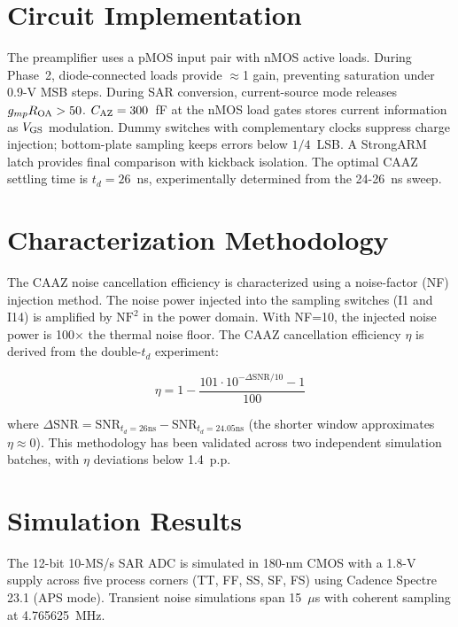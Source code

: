 \documentclass[journal]{IEEEtran}
\begin{document}
\section{Circuit Implementation}
\label{sec:imp}

The preamplifier uses a pMOS input pair with nMOS active loads. During Phase~2, diode-connected loads provide $\approx$1 gain, preventing saturation under 0.9-V MSB steps. During SAR conversion, current-source mode releases $g_{mp}R_{\rm OA}>50$. $C_{\rm AZ}=300$~fF at the nMOS load gates stores current information as $V_{\rm GS}$ modulation. Dummy switches with complementary clocks suppress charge injection; bottom-plate sampling keeps errors below $1/4$~LSB. A StrongARM latch provides final comparison with kickback isolation. The optimal CAAZ settling time is $t_d=26$~ns, experimentally determined from the 24-26~ns sweep.

\section{Characterization Methodology}
\label{sec:method}

The CAAZ noise cancellation efficiency is characterized using a noise-factor (NF) injection method. The noise power injected into the sampling switches (I1 and I14) is amplified by $\text{NF}^2$ in the power domain. With NF=10, the injected noise power is 100$\times$ the thermal noise floor. The CAAZ cancellation efficiency $\eta$ is derived from the double-$t_d$ experiment:

\begin{equation}
\eta = 1 - \frac{101\cdot 10^{-\Delta\text{SNR}/10} - 1}{100}
\label{eq:eta}
\end{equation}

where $\Delta\text{SNR} = \text{SNR}_{t_d=26\text{ns}} - \text{SNR}_{t_d=24.05\text{ns}}$ (the shorter window approximates $\eta\approx0$). This methodology has been validated across two independent simulation batches, with $\eta$ deviations below 1.4~p.p.

\section{Simulation Results}
\label{sec:sim}

The 12-bit 10-MS/s SAR ADC is simulated in 180-nm CMOS with a 1.8-V supply across five process corners (TT, FF, SS, SF, FS) using Cadence Spectre 23.1 (APS mode). Transient noise simulations span 15~$\mu$s with coherent sampling at 4.765625~MHz.
\end{document}
